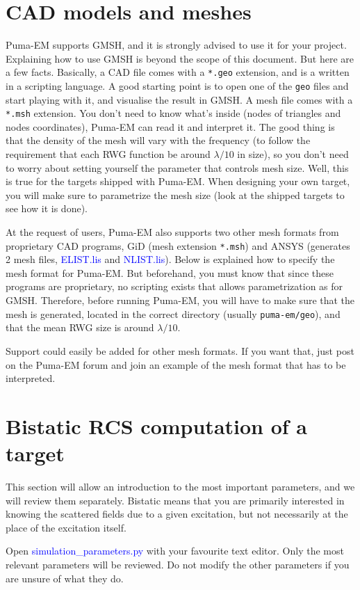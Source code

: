\documentclass[a4paper,10pt]{book}
\newcommand{\file}[1] {\textcolor{blue}{\textsf{#1}}}
\begin{document}
\section{CAD models and meshes}
%
\par
Puma-EM supports GMSH, and it is strongly advised to use it for your project. Explaining how to use GMSH is beyond the scope of this document. But here are a few facts. Basically, a CAD file comes with a \texttt{*.geo} extension, and is a written in a scripting language. A good starting point is to open one of the \texttt{geo} files and start playing with it, and visualise the result in GMSH. A mesh file comes with a \texttt{*.msh} extension. You don't need to know what's inside (nodes of triangles and nodes coordinates), Puma-EM can read it and interpret it. The good thing is that the density of the mesh will vary with the frequency (to follow the requirement that each RWG function be around $\lambda/10$ in size), so you don't need to worry about setting yourself the parameter that controls mesh size. Well, this is true for the targets shipped with Puma-EM. When designing your own target, you will make sure to parametrize the mesh size (look at the shipped targets to see how it is done).
%
\par
At the request of users, Puma-EM also supports two other mesh formats from proprietary CAD programs, GiD (mesh extension \texttt{*.msh}) and ANSYS (generates 2 mesh files, \file{ELIST.lis} and \file{NLIST.lis}). Below is explained how to specify the mesh format for Puma-EM. But beforehand, you must know that since these programs are proprietary, no scripting exists that allows parametrization as for GMSH. Therefore, before running Puma-EM, you will have to make sure that the mesh is generated, located in the correct directory (usually \texttt{puma-em/geo}), and that the mean RWG size is around $\lambda/10$.
%
\par
Support could easily be added for other mesh formats. If you want that, just post on the Puma-EM forum and join an example of the mesh format that has to be interpreted.

\section{Bistatic RCS computation of a target}
%
This section will allow an introduction to the most important parameters, and we will review them separately. Bistatic means that you are primarily interested in knowing the scattered fields due to a given excitation, but not necessarily at the place of the excitation itself.
%
\par
Open \file{simulation\_parameters.py} with your favourite text editor. Only the most relevant parameters will be reviewed. Do not modify the other parameters if you are unsure of what they do.
\end{document}
